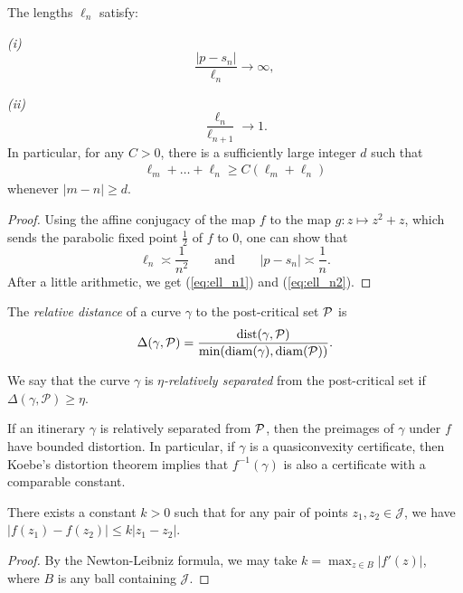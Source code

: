 \begin{lemma} \label{lem-ell_n}
	The lengths ${\ell_n}$ satisfy:
	
	{\em (i)}
	\begin{equation}
	\label{eq:ell_n1}
		\frac {|p-s_n|}{\ell_n} \to \infty,
	\end{equation}
	
	{\em (ii)}
	\begin{equation}
	\label{eq:ell_n2}
		\frac{\ell_n}{\ell_{n+1}} \to 1.
	\end{equation}
	In particular, for any $C > 0$, there is a sufficiently large integer $d$ such that
	\begin{align*}
		\ell_{m}+\ldots+\ell_{n} \geq C (\ell_m+\ell_n)
	\end{align*}
	whenever $|m-n| \geq d$.
\end{lemma}

\begin{proof}
Using the affine conjugacy of the map $f$ to the map $g: z\mapsto z^2+z$, which sends the parabolic fixed point $\frac{1}{2}$ of $f$ to $0$, one can show that
$$
\ell_n \asymp \frac{1}{n^2} \qquad \text{and} \qquad |p - s_n| \asymp \frac{1}{n}.
$$
After a little arithmetic, we get (\ref{eq:ell_n1}) and (\ref{eq:ell_n2}).
\end{proof}

\begin{definition}
The \emph{relative distance} of a curve $\gamma$ to the post-critical set $\operatorname{\mathcal P}$ is 
$$
\Delta (\gamma, \mathcal P) = \frac {\operatorname{dist}(\gamma, \mathcal P)}{\min (\operatorname{diam} (\gamma), \operatorname{diam} (\mathcal P))}.
$$

We say that the curve $\gamma$ is \emph{$\eta$-relatively separated} from the post-critical set if $\Delta (\gamma, \mathcal P) \geq \eta$.  
\end{definition}
 
If an itinerary $\gamma$ is relatively separated from $\operatorname{\mathcal P}$, then the preimages of $\gamma$ under $f$ have bounded distortion. In particular, if $\gamma$ is a quasiconvexity certificate, then Koebe's distortion theorem implies that $f^{-1}(\gamma)$ is also a certificate with a comparable constant.

\begin{lemma}
There exists a constant $k>0$ such that for any pair of points $z_1, z_2 \in \mathcal J$, we have $|f(z_1)-f(z_2)| \leq k|z_1-z_2|$.
\end{lemma}

\begin{proof}
By the Newton-Leibniz formula, we may take $k=\max_{z \in B} |f'(z)|$, where $B$ is any ball containing $\mathcal J$. 
\end{proof}
 
